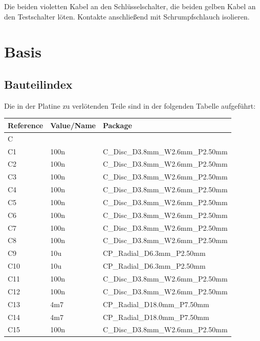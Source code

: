 \documentclass[paper=a4, open=any]{scrbook}
\begin{document}
					Die beiden violetten Kabel an den Schlüsselschalter, die beiden gelben Kabel an den Testschalter löten. Kontakte anschließend mit Schrumpfschlauch isolieren.

					\newpage
			\section{Basis}
				\subsection*{Bauteilindex}

					Die in der Platine zu verlötenden Teile sind in der folgenden Tabelle aufgeführt:

					\begin{longtabu}
						to \textwidth[l]{lX[-1]X}
						Reference & Value/Name             & Package                                                 \\ \hline\hline
						\endhead
						C         &                        &                                                         \\*
						C1        & 100n                   & C\_Disc\_D3.8mm\_W2.6mm\_P2.50mm                        \\
						C2        & 100n                   & C\_Disc\_D3.8mm\_W2.6mm\_P2.50mm                        \\
						C3        & 100n                   & C\_Disc\_D3.8mm\_W2.6mm\_P2.50mm                        \\
						C4        & 100n                   & C\_Disc\_D3.8mm\_W2.6mm\_P2.50mm                        \\
						C5        & 100n                   & C\_Disc\_D3.8mm\_W2.6mm\_P2.50mm                        \\
						C6        & 100n                   & C\_Disc\_D3.8mm\_W2.6mm\_P2.50mm                        \\
						C7        & 100n                   & C\_Disc\_D3.8mm\_W2.6mm\_P2.50mm                        \\
						C8        & 100n                   & C\_Disc\_D3.8mm\_W2.6mm\_P2.50mm                        \\
						C9        & 10u                    & CP\_Radial\_D6.3mm\_P2.50mm                             \\
						C10       & 10u                    & CP\_Radial\_D6.3mm\_P2.50mm                             \\
						C11       & 100n                   & C\_Disc\_D3.8mm\_W2.6mm\_P2.50mm                        \\
						C12       & 100n                   & C\_Disc\_D3.8mm\_W2.6mm\_P2.50mm                        \\
						C13       & 4m7                    & CP\_Radial\_D18.0mm\_P7.50mm                            \\
						C14       & 4m7                    & CP\_Radial\_D18.0mm\_P7.50mm                            \\
						C15       & 100n                   & C\_Disc\_D3.8mm\_W2.6mm\_P2.50mm                        \\
						\hline


\end{longtabu}
\end{document}
